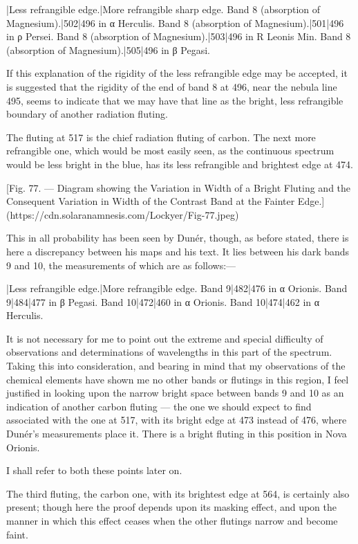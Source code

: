 \documentclass[a4paper, 12pt, oneside, polutonikogreek, english]{article}
\begin{document}
|Less refrangible edge.|More refrangible sharp edge. 
Band 8 (absorption of Magnesium).|502|496 in α Herculis. 
Band 8 (absorption of Magnesium).|501|496 in ρ Persei. 
Band 8 (absorption of Magnesium).|503|496 in R Leonis Min. 
Band 8 (absorption of Magnesium).|505|496 in β Pegasi. 

If this explanation of the rigidity of the less refrangible edge may be accepted, it is suggested that the rigidity of the end of band 8 at 496, near the nebula line 495, seems to indicate that we may have that line as the bright, less refrangible boundary of another radiation fluting.

The fluting at 517 is the chief radiation fluting of carbon. The next more refrangible one, which would be most easily seen, as the continuous spectrum would be less bright in the blue, has its less refrangible and brightest edge at 474.

[Fig. 77. --- Diagram showing the Variation in Width of a Bright Fluting and the Consequent Variation in Width of the Contrast Band at the Fainter Edge.](https://cdn.solaranamnesis.com/Lockyer/Fig-77.jpeg)

This in all probability has been seen by Dunér, though, as before stated, there is here a discrepancy between his maps and his text. It lies between his dark bands 9 and 10, the measurements of which are as follows:---

|Less refrangible edge.|More refrangible edge. 
Band 9|482|476 in α Orionis. 
Band 9|484|477 in β Pegasi. 
Band 10|472|460 in α Orionis. 
Band 10|474|462 in α Herculis. 

It is not necessary for me to point out the extreme and special difficulty of observations and determinations of wavelengths in this part of the spectrum. Taking this into consideration, and bearing in mind that my observations of the chemical elements have shown me no other bands or flutings in this region, I feel justified in looking upon the narrow bright space between bands 9 and 10 as an indication of another carbon fluting --- the one we should expect to find associated with the one at 517, with its bright edge at 473 instead of 476, where Dunér's measurements place it. There is a bright fluting in this position in Nova Orionis.

I shall refer to both these points later on.

The third fluting, the carbon one, with its brightest edge at 564, is certainly also present; though here the proof depends upon its masking effect, and upon the manner in which this effect ceases when the other flutings narrow and become faint.
\end{document}
